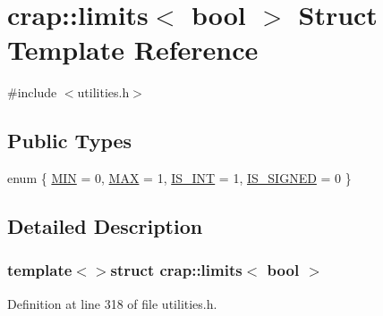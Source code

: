 \hypertarget{structcrap_1_1limits_3_01bool_01_4}{}\section{crap\+:\+:limits$<$ bool $>$ Struct Template Reference}
\label{structcrap_1_1limits_3_01bool_01_4}


{\ttfamily \#include $<$utilities.\+h$>$}

\subsection*{Public Types}
\begin{DoxyCompactItemize}
\item 
enum \{ \hyperlink{structcrap_1_1limits_3_01bool_01_4_af27b2b0a135c27820b952d2361e1cbc7a9a55bfd482f1eb8c71b02333050b7562}{M\+I\+N} = 0, 
\hyperlink{structcrap_1_1limits_3_01bool_01_4_af27b2b0a135c27820b952d2361e1cbc7a6b42ad4f43c39965b3511bba1dd28617}{M\+A\+X} = 1, 
\hyperlink{structcrap_1_1limits_3_01bool_01_4_af27b2b0a135c27820b952d2361e1cbc7a2de281e498030a18240f61dc484ec205}{I\+S\+\_\+\+I\+N\+T} = 1, 
\hyperlink{structcrap_1_1limits_3_01bool_01_4_af27b2b0a135c27820b952d2361e1cbc7a47976b05af95957aa2d4187566f277fa}{I\+S\+\_\+\+S\+I\+G\+N\+E\+D} = 0
 \}
\end{DoxyCompactItemize}


\subsection{Detailed Description}
\subsubsection*{template$<$$>$struct crap\+::limits$<$ bool $>$}



Definition at line 318 of file utilities.\+h.



